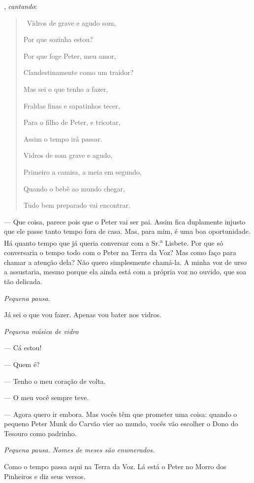 \begin{myparindent}{0pt}
\begin{Parskip}
, \emph{cantando}:

\begin{quote}
\quad \, Vidros de grave e agudo som,

Por que sozinha estou?

Por que foge Peter, meu amor,

Clandestinamente como um traidor?

Mas sei o que tenho a fazer,

Fraldas finas e sapatinhos tecer,

Para o filho de Peter, e tricotar,

Assim o tempo irá passar.

Vidros de som grave e agudo,

Primeiro a camisa, a meia em segundo,

Quando o bebê ao mundo chegar,

Tudo bem preparado vai encontrar.

\end{quote}

 --- Que coisa, parece pois que o Peter vai ser pai. Assim fica
duplamente injusto que ele passe tanto tempo fora de casa. Mas, para
mim, é uma boa oportunidade. Há quanto tempo que já queria conversar com
a Sr.\textsuperscript{a} Lisbete. Por que só conversaria o tempo todo
com o Peter na Terra da Voz? Mas como faço para chamar a atenção dela?
Não quero simplesmente chamá-la. A minha voz de urso a assustaria, mesmo
porque ela ainda está com a própria voz no ouvido, que soa tão delicada.

\emph{Pequena pausa.}

Já sei o que vou fazer. Apenas vou bater nos vidros.

\emph{Pequena música de vidro}

 --- Cá estou!

 --- Quem é?

 --- Tenho o meu coração de volta.

 --- O meu você sempre teve.

 --- Agora quero ir embora. Mas vocês têm que prometer uma coisa:
quando o pequeno Peter Munk do Carvão vier ao mundo, vocês vão escolher
o Dono do Tesouro como padrinho.

\emph{Pequena pausa. Nomes de meses são enumerados.}

Como o tempo passa aqui na Terra da Voz. Lá está o Peter no Morro dos
Pinheiros e diz seus versos.


\end{Parskip}
\end{myparindent}

